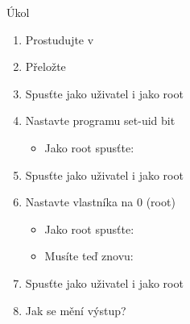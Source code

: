 \begin{frame}{Úkol}

  \begin{enumerate}
    \item Prostudujte  v \ifpcdirlinux {} \else
       \fi
    \item Přeložte
    \item Spusťte jako uživatel i jako root

    \item Nastavte programu set-uid bit
    \begin{itemize}
      \item Jako root spusťte: 
    \end{itemize}

    \item Spusťte jako uživatel i jako root

    \item Nastavte vlastníka na 0 (root)
    \begin{itemize}
      \item Jako root spusťte: 
      \item Musíte teď znovu: 
    \end{itemize}

    \item Spusťte jako uživatel i jako root
    \item Jak se mění výstup?
  \end{enumerate}

\end{frame}

